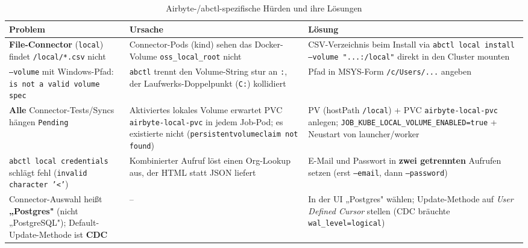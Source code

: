 \documentclass[a4paper,12pt]{article}
\begin{document}
\begin{table}[H]
    \caption{Airbyte-/abctl-spezifische Hürden und ihre Lösungen}
    \centering\small
    \begin{tabular}{@{}L{5cm}L{4.5cm}L{5cm}@{}}
        \toprule
        \textbf{Problem} & \textbf{Ursache} & \textbf{Lösung} \\
        \midrule
        \textbf{File-Connector} (\texttt{local}) findet \texttt{/local/*.csv} nicht &
            Connector-Pods (kind) sehen das Docker-Volume \texttt{oss\_local\_root} nicht &
            CSV-Verzeichnis beim Install via
            \texttt{abctl local install --volume "...:/local"} direkt in den
            Cluster mounten \\
        \addlinespace[4pt]
        \texttt{--volume} mit Windows-Pfad: \texttt{is not a valid volume spec} &
            \texttt{abctl} trennt den Volume-String stur an \texttt{:},
            der Laufwerks-Doppelpunkt (\texttt{C:}) kollidiert &
            Pfad in MSYS-Form \texttt{/c/Users/...} angeben \\
        \addlinespace[4pt]
        \textbf{Alle} Connector-Tests/Syncs hängen \texttt{Pending} &
            Aktiviertes lokales Volume erwartet PVC \texttt{airbyte-local-pvc}
            in jedem Job-Pod; es existierte nicht
            (\texttt{persistentvolumeclaim not found}) &
            PV (hostPath \texttt{/local}) + PVC \texttt{airbyte-local-pvc} anlegen;\newline
            \texttt{JOB\_KUBE\_LOCAL\_VOLUME\_}\linebreak\texttt{ENABLED=true} + Neustart
            von launcher/worker \\
        \addlinespace[4pt]
        \texttt{abctl local credentials} schlägt fehl
        (\texttt{invalid character '<'}) &
            Kombinierter Aufruf löst einen Org-Lookup aus,
            der HTML statt JSON liefert &
            E-Mail und Passwort in \textbf{zwei getrennten} Aufrufen setzen
            (erst \texttt{--email}, dann \texttt{--password}) \\
        \addlinespace[4pt]
        Connector-Auswahl heißt \textbf{„Postgres"} (nicht „PostgreSQL");
        Default-Update-Methode ist \textbf{CDC} &
            -- &
            In der UI „Postgres" wählen; Update-Methode auf
            \textit{User Defined Cursor} stellen
            (CDC bräuchte \texttt{wal\_level=logical}) \\
        \bottomrule
    \end{tabular}
\end{table}
 
\end{document}
